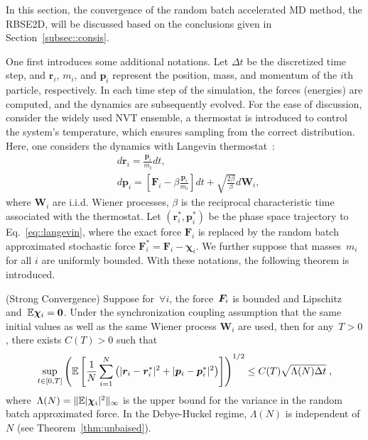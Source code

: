 In this section, the convergence of the random batch accelerated MD method, the RBSE2D, will be discussed based on the conclusions given in Section~\ref{subsec::consis}.

One first introduces some additional notations.
Let $\Delta t$ be the discretized time step, and $\bm{r}_i$, $m_i$, and $\bm{p}_i$ represent the position, mass, and momentum of the $i$th particle, respectively. 
In each time step of the simulation, the forces (energies) are computed, and the dynamics are subsequently evolved. 
For the ease of discussion, consider the widely used NVT ensemble, a thermostat is introduced to control the system's temperature, which ensures sampling from the correct distribution. 
Here, one considers the dynamics with Langevin thermostat~\cite{frenkel2023understanding}:
\begin{equation}\label{eq::langevin}
	\begin{split}
		& d \boldsymbol{r}_i = \frac{\boldsymbol{p}_i}{m_i} d t, \\ 
		& d \boldsymbol{p}_i = \left[\boldsymbol{F}_i - \beta \frac{\boldsymbol{p}_i}{m_i}\right] d t + \sqrt{\frac{2 \beta}{\beta}} d \boldsymbol{W}_i,
	\end{split}
\end{equation}
where $\boldsymbol{W}_i$ are i.i.d. Wiener processes, $\beta$ is the reciprocal characteristic time associated with the thermostat.
Let $(\bm{r}_i^*, \bm{p}_i^*)$ be the phase space trajectory to Eq.~\eqref{eq::langevin}, where the exact force $\bm{F}_i$ is replaced by the random batch approximated stochastic force $\bm{F}_i^*=\bm{F}_i-\bm{\chi}_i$. We further suppose that masses~$m_{i}$ for all $i$ are uniformly bounded.
With these notations, the following theorem is introduced.
\begin{thm} (Strong Convergence)
	Suppose for~$\forall i$, the force~$\boldsymbol{F}_{i}$ is bounded and Lipschitz and~$\mathbb{E} \boldsymbol{\chi}_{i} = \bm 0$. Under the synchronization coupling assumption that the same initial values as well as the same Wiener process $\bm{W}_i$ are used, then for any~$T > 0$, there exists $C(T) > 0$ such that
	\begin{equation}\label{eq::bound}
		\sup_{t\in[0,T]}\left( \mathbb{E} \left[ \frac{1}{N} \sum_{i = 1}^N \left(\lvert\boldsymbol{r}_{i} - \boldsymbol{r}_{i}^*\rvert^2 + \lvert\boldsymbol{p}_{i} - \boldsymbol{p}_{i}^*\rvert^2\right) \right] \right)^{1/2} \leq C(T) \sqrt{\Lambda(N) \Delta t}\;,
	\end{equation}
	where~$\Lambda(N)=\|\mathbb{E} \lvert\boldsymbol{\chi}_{i}\rvert^2\|_{\infty}$ is the upper bound for the variance in the random batch approximated force. In the Debye-H$\ddot{\text{u}}$ckel regime, $\Lambda(N)$ is independent of $N$ (see Theorem~\ref{thm:unbaised}).
	\label{thm:rbm_consist}
\end{thm}


